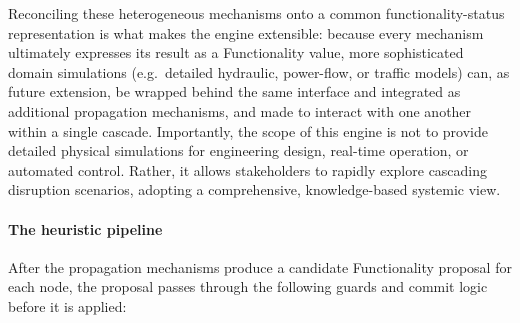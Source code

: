 \documentclass[review,12pt]{elsarticle}
\begin{document}
Reconciling these heterogeneous mechanisms onto a common functionality-status representation is what makes the engine extensible: because every mechanism ultimately expresses its result as a Functionality value, more sophisticated domain simulations (e.g.\ detailed hydraulic, power-flow, or traffic models) can, as future extension, be wrapped behind the same interface and integrated as additional propagation mechanisms, and made to interact with one
another within a single cascade. Importantly, the scope of this engine is not to provide detailed physical simulations for engineering design, real-time operation, or automated control. Rather, it allows stakeholders to rapidly explore cascading disruption scenarios, adopting a comprehensive, knowledge-based systemic view.

\paragraph{The heuristic pipeline}
After the propagation mechanisms produce a candidate Functionality proposal for each node, the proposal passes through the following guards and commit logic before it is applied:
\end{document}

